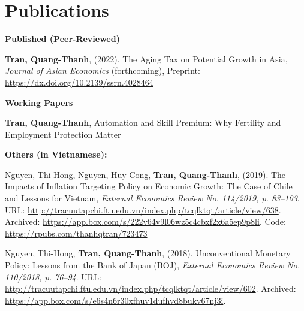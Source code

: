 \section{\sc Publications}
{\bf Published (Peer-Reviewed)}
\vspace*{.05in}
\begin{etaremune}[]
\item
  {\bf Tran, Quang-Thanh},
  (2022).
  {The Aging Tax on Potential Growth in Asia},
  {\it Journal of Asian Economics} (forthcoming),
  {Preprint: \url{https://dx.doi.org/10.2139/ssrn.4028464}}
\end{etaremune}

\vspace{4mm}

{\bf Working Papers}
\vspace*{.05in}
\begin{etaremune}[]
\item
  {\bf Tran, Quang-Thanh},
  {Automation and Skill Premium: Why Fertility and Employment Protection Matter}
\end{etaremune}

\vspace{4mm}


{\bf Others (in Vietnamese):}
\vspace*{.05in}
\begin{etaremune}[]
	\item
	Nguyen, Thi-Hong,
	Nguyen, Huy-Cong,
	{\bf Tran, Quang-Thanh},
	(2019).
	{The Impacts of Inflation Targeting Policy on Economic Growth: The Case of Chile and Lessons for Vietnam},
	{\it External Economics Review No. 114/2019, p. 83--103}.
	{URL: \url{http://tracuutapchi.ftu.edu.vn/index.php/tcqlktqt/article/view/638}}.
	{Archived: \url{https://app.box.com/s/222v64v9l06wz5c4cbxf2x6a5ep9p8li}. Code: \url{https://rpubs.com/thanhqtran/723473}}

	\item 
	Nguyen, Thi-Hong,
	{\bf Tran, Quang-Thanh},
	(2018).
	Unconventional Monetary Policy: Lessons from the Bank of Japan (BOJ),
	{\it External Economics Review No. 110/2018, p. 76--94}.
	{URL: \url{http://tracuutapchi.ftu.edu.vn/index.php/tcqlktqt/article/view/602}}. 
	{Archived: \url{https://app.box.com/s/e6s4n6r30xfhuv1dufhvd8bukv67nj3i}}.
\end{etaremune}


